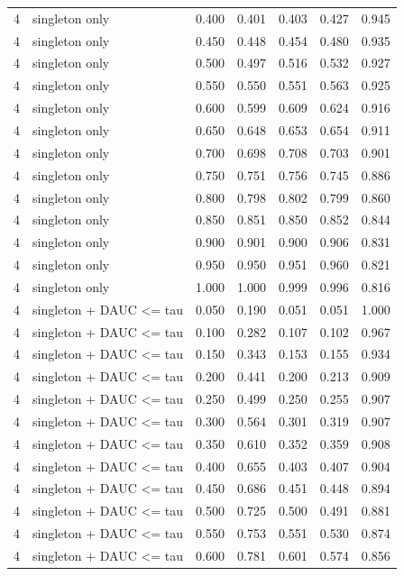 \begin{tabular}{rlrrrrr}
4 & singleton only & 0.400 & 0.401 & 0.403 & 0.427 & 0.945 \\
4 & singleton only & 0.450 & 0.448 & 0.454 & 0.480 & 0.935 \\
4 & singleton only & 0.500 & 0.497 & 0.516 & 0.532 & 0.927 \\
4 & singleton only & 0.550 & 0.550 & 0.551 & 0.563 & 0.925 \\
4 & singleton only & 0.600 & 0.599 & 0.609 & 0.624 & 0.916 \\
4 & singleton only & 0.650 & 0.648 & 0.653 & 0.654 & 0.911 \\
4 & singleton only & 0.700 & 0.698 & 0.708 & 0.703 & 0.901 \\
4 & singleton only & 0.750 & 0.751 & 0.756 & 0.745 & 0.886 \\
4 & singleton only & 0.800 & 0.798 & 0.802 & 0.799 & 0.860 \\
4 & singleton only & 0.850 & 0.851 & 0.850 & 0.852 & 0.844 \\
4 & singleton only & 0.900 & 0.901 & 0.900 & 0.906 & 0.831 \\
4 & singleton only & 0.950 & 0.950 & 0.951 & 0.960 & 0.821 \\
4 & singleton only & 1.000 & 1.000 & 0.999 & 0.996 & 0.816 \\
4 & singleton + DAUC <= tau & 0.050 & 0.190 & 0.051 & 0.051 & 1.000 \\
4 & singleton + DAUC <= tau & 0.100 & 0.282 & 0.107 & 0.102 & 0.967 \\
4 & singleton + DAUC <= tau & 0.150 & 0.343 & 0.153 & 0.155 & 0.934 \\
4 & singleton + DAUC <= tau & 0.200 & 0.441 & 0.200 & 0.213 & 0.909 \\
4 & singleton + DAUC <= tau & 0.250 & 0.499 & 0.250 & 0.255 & 0.907 \\
4 & singleton + DAUC <= tau & 0.300 & 0.564 & 0.301 & 0.319 & 0.907 \\
4 & singleton + DAUC <= tau & 0.350 & 0.610 & 0.352 & 0.359 & 0.908 \\
4 & singleton + DAUC <= tau & 0.400 & 0.655 & 0.403 & 0.407 & 0.904 \\
4 & singleton + DAUC <= tau & 0.450 & 0.686 & 0.451 & 0.448 & 0.894 \\
4 & singleton + DAUC <= tau & 0.500 & 0.725 & 0.500 & 0.491 & 0.881 \\
4 & singleton + DAUC <= tau & 0.550 & 0.753 & 0.551 & 0.530 & 0.874 \\
4 & singleton + DAUC <= tau & 0.600 & 0.781 & 0.601 & 0.574 & 0.856 \\

\end{tabular}
